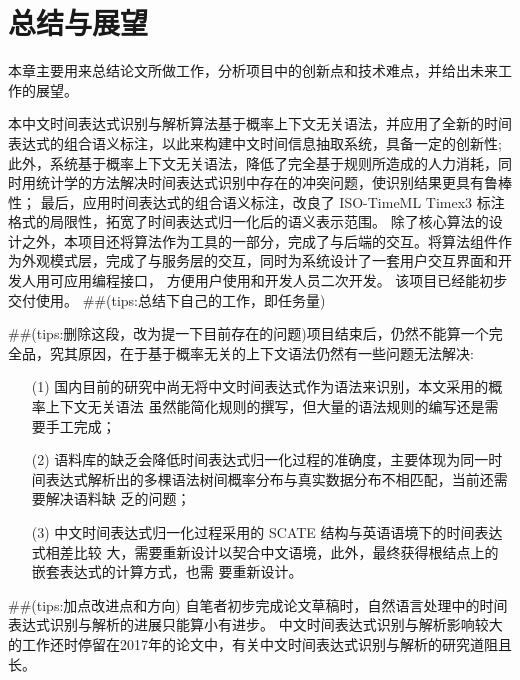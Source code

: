 
\chapter{总结与展望}

本章主要用来总结论文所做工作，分析项目中的创新点和技术难点，并给出未来工作的展望。

本中文时间表达式识别与解析算法基于概率上下文无关语法，并应用了全新的时间表达式的组合语义标注，以此来构建中文时间信息抽取系统，具备一定的创新性;
此外，系统基于概率上下文无关语法，降低了完全基于规则所造成的人力消耗，同时用统计学的方法解决时间表达式识别中存在的冲突问题，使识别结果更具有鲁棒性；
最后，应用时间表达式的组合语义标注，改良了 ISO-TimeML Timex3 标注格式的局限性，拓宽了时间表达式归一化后的语义表示范围。
除了核心算法的设计之外，本项目还将算法作为工具的一部分，完成了与后端的交互。将算法组件作为外观模式层，完成了与服务层的交互，同时为系统设计了一套用户交互界面和开发人用可应用编程接口，
方便用户使用和开发人员二次开发。 该项目已经能初步交付使用。
##(tips:总结下自己的工作，即任务量)

##(tips:删除这段，改为提一下目前存在的问题)项目结束后，仍然不能算一个完全品，究其原因，在于基于概率无关的上下文语法仍然有一些问题无法解决:
\begin{enumerate}
    \item[(1)] 国内目前的研究中尚无将中文时间表达式作为语法来识别，本文采用的概率上下文无关语法
    虽然能简化规则的撰写，但大量的语法规则的编写还是需要手工完成；
    \item[(2)] 语料库的缺乏会降低时间表达式归一化过程的准确度，主要体现为同一时
    间表达式解析出的多棵语法树间概率分布与真实数据分布不相匹配，当前还需要解决语料缺
    乏的问题；
    \item[(3)] 中文时间表达式归一化过程采用的 SCATE 结构与英语语境下的时间表达式相差比较
    大，需要重新设计以契合中文语境，此外，最终获得根结点上的嵌套表达式的计算方式，也需
    要重新设计。
\end{enumerate}

##(tips:加点改进点和方向)
自笔者初步完成论文草稿时，自然语言处理中的时间表达式识别与解析的进展只能算小有进步。
中文时间表达式识别与解析影响较大的工作还时停留在2017年的论文中，有关中文时间表达式识别与解析的研究道阻且长。
